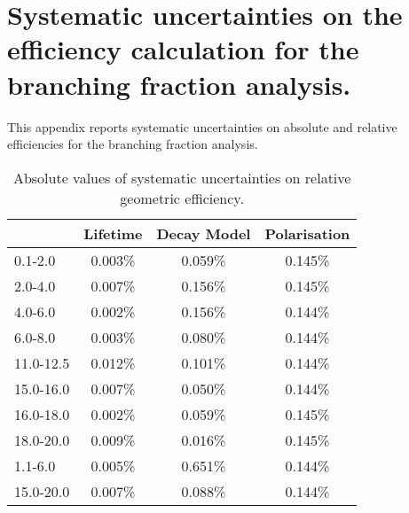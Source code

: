 \chapter{Systematic uncertainties on the efficiency calculation for the \Lb\to\Lz\mumu
branching fraction analysis.}
\label{app:Lb_systematics}

This appendix reports systematic uncertainties on absolute and relative 
efficiencies for the \Lb\to\Lz\mumu branching fraction analysis.


\begin{table}
\centering
\begin{tabular}{l|ccc} 
\qsq [\gevgevcccc]	 & Lifetime  & Decay Model   & Polarisation  \\ \hline
0.1-2.0  	 & 0.003\% 	 & 0.059\% 	 & 0.145\% 	 \\ 
2.0-4.0  	 & 0.007\% 	 & 0.156\% 	 & 0.145\% 	 \\ 
4.0-6.0  	 & 0.002\% 	 & 0.156\% 	 & 0.144\% 	 \\ 
6.0-8.0      & 0.003\%   & 0.080\%   & 0.144\%   \\
11.0-12.5  	 & 0.012\% 	 & 0.101\% 	 & 0.144\% 	 \\ 
15.0-16.0  	 & 0.007\% 	 & 0.050\% 	 & 0.144\% 	 \\ 
16.0-18.0  	 & 0.002\% 	 & 0.059\% 	 & 0.145\% 	 \\ 
18.0-20.0  	 & 0.009\% 	 & 0.016\% 	 & 0.145\% 	 \\ 
 \hline
1.1-6.0  	 & 0.005\% 	 & 0.651\% 	 & 0.144\% 	 \\ 
15.0-20.0  	 & 0.007\% 	 & 0.088\% 	 & 0.144\% 	 \\ 
\end{tabular}
\caption{Absolute values of systematic uncertainties on relative geometric efficiency.}
\label{tab:relativeGeomSys}
\end{table}

